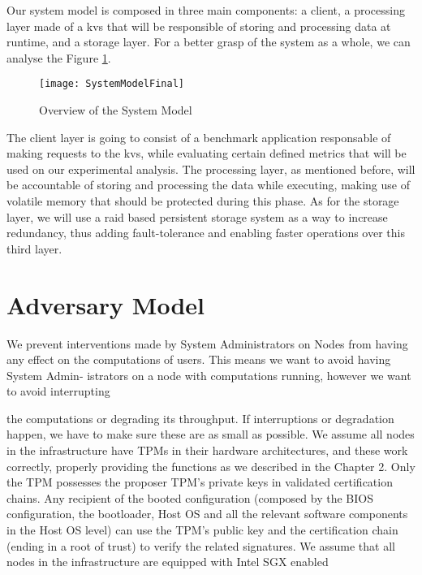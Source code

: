 Our system model is composed in three main components: a client, a processing layer made of a \gls{kvs} that will be responsible of storing and processing data at runtime, and a storage layer. For a better grasp of the system as a whole, we can analyse the Figure \ref{fig:systemModel}.

\begin{figure}[htbp]
	\centering
	{\texttt{[image: SystemModelFinal]}}
	\caption{Overview of the System Model}
	\label{fig:systemModel}
\end{figure}

The client layer is going to consist of a benchmark application responsable of making requests to the \gls{kvs}, while evaluating certain defined metrics that will be used on our experimental analysis.
The processing layer, as mentioned before, will be accountable of storing and processing the data while executing, making use of volatile memory that should be protected during this phase.
As for the storage layer, we will use a \gls{raid} based persistent storage system as a way to increase redundancy, thus adding fault-tolerance and enabling faster operations over this third layer.




\section{Adversary Model} %
\label{sec:inserting_tables}

We prevent interventions made by System Administrators on Nodes from having any
effect on the computations of users. This means we want to avoid having System Admin-
istrators on a node with computations running, however we want to avoid interrupting

the computations or degrading its throughput. If interruptions or degradation happen,
we have to make sure these are as small as possible.
We assume all nodes in the infrastructure have TPMs in their hardware architectures,
and these work correctly, properly providing the functions as we described in the Chapter
2. Only the TPM possesses the proposer TPM’s private keys in validated certification
chains. Any recipient of the booted configuration (composed by the BIOS configuration,
the bootloader, Host OS and all the relevant software components in the Host OS level)
can use the TPM’s public key and the certification chain (ending in a root of trust) to
verify the related signatures.
We assume that all nodes in the infrastructure are equipped with Intel SGX enabled

